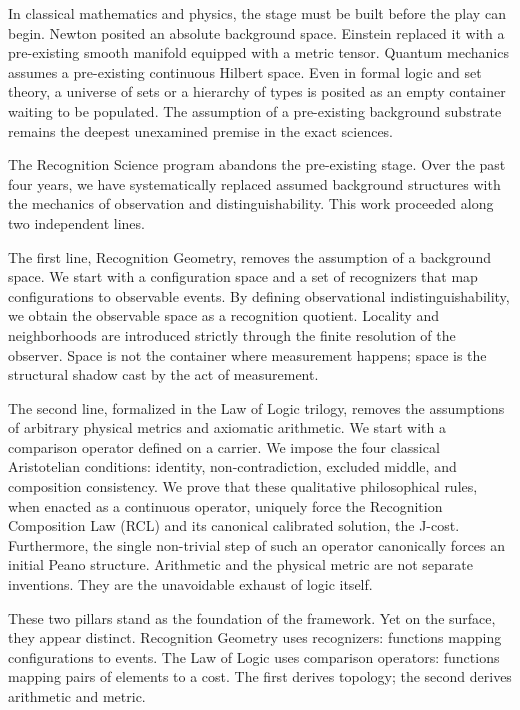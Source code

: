 \documentclass[11pt,a4paper]{article}
\theoremstyle{definition}
\theoremstyle{remark}
\begin{document}
In classical mathematics and physics, the stage must be built before the play can begin. Newton posited an absolute background space. Einstein replaced it with a pre-existing smooth manifold equipped with a metric tensor. Quantum mechanics assumes a pre-existing continuous Hilbert space. Even in formal logic and set theory, a universe of sets or a hierarchy of types is posited as an empty container waiting to be populated. The assumption of a pre-existing background substrate remains the deepest unexamined premise in the exact sciences.

The Recognition Science program abandons the pre-existing stage. Over the past four years, we have systematically replaced assumed background structures with the mechanics of observation and distinguishability. This work proceeded along two independent lines.

The first line, Recognition Geometry, removes the assumption of a background space. We start with a configuration space and a set of recognizers that map configurations to observable events. By defining observational indistinguishability, we obtain the observable space as a recognition quotient. Locality and neighborhoods are introduced strictly through the finite resolution of the observer. Space is not the container where measurement happens; space is the structural shadow cast by the act of measurement.

The second line, formalized in the Law of Logic trilogy, removes the assumptions of arbitrary physical metrics and axiomatic arithmetic. We start with a comparison operator defined on a carrier. We impose the four classical Aristotelian conditions: identity, non-contradiction, excluded middle, and composition consistency. We prove that these qualitative philosophical rules, when enacted as a continuous operator, uniquely force the Recognition Composition Law (RCL) and its canonical calibrated solution, the J-cost. Furthermore, the single non-trivial step of such an operator canonically forces an initial Peano structure. Arithmetic and the physical metric are not separate inventions. They are the unavoidable exhaust of logic itself.

These two pillars stand as the foundation of the framework. Yet on the surface, they appear distinct. Recognition Geometry uses recognizers: functions mapping configurations to events. The Law of Logic uses comparison operators: functions mapping pairs of elements to a cost. The first derives topology; the second derives arithmetic and metric.
\end{document}
